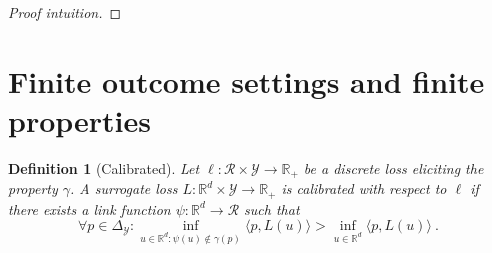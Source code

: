 \documentclass{article}
\newcommand{\Comments}{1}
\newcommand{\mynote}[2]{\ifnum\Comments=1\textcolor{#1}{#2}\fi}
\newcommand{\jessie}[1]{\mynote{purple}{[JF: #1]}}
\newcommand{\reals}{\mathbb{R}}
\newcommand{\simplex}{\Delta_\Y}
\newcommand{\R}{\mathcal{R}}
\newcommand{\Y}{\mathcal{Y}}
\newcommand{\inprod}[2]{\langle #1, #2 \rangle}
\newtheorem{definition}{Definition}
\begin{document}
\begin{proof}[Proof intuition]
		
	
%	 
\end{proof}


\section{Finite outcome settings and finite properties}
\begin{definition}[Calibrated]
	Let $\ell : \R \times \Y \to \reals_+$ be a discrete loss eliciting the property $\gamma$.
	A surrogate loss $L : \reals^d \times \Y \to \reals_+$ is \emph{calibrated} with respect to $\ell$ if there exists a link function $\psi: \reals^d \to \R$ such that
	\begin{equation}
	\forall p \in \simplex: \inf_{u \in \reals^d : \psi(u) \not \in \gamma(p)} \inprod{p}{L(u)} > \inf_{u \in \reals^d} \inprod{p}{L(u)}~.~
	\end{equation}
\end{definition}
\end{document}
